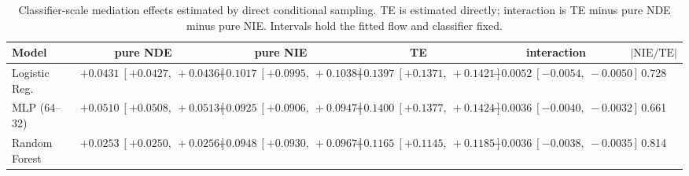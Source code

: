 \begin{table}[htbp]
  \centering
  \caption{Classifier-scale mediation effects estimated by direct conditional sampling. TE is estimated directly; interaction is TE minus pure NDE minus pure NIE. Intervals hold the fitted flow and classifier fixed.}
  \label{tab:german_synth_m05_gap_overall}
  \begin{tabular}{lccccc}
    \toprule
    Model & pure NDE & pure NIE & TE & interaction & $|\mathrm{NIE}/\mathrm{TE}|$ \\
    \midrule
    Logistic Reg. & $+0.0431\ [+0.0427,\ +0.0436]$ & $+0.1017\ [+0.0995,\ +0.1038]$ & $+0.1397\ [+0.1371,\ +0.1421]$ & $-0.0052\ [-0.0054,\ -0.0050]$ & 0.728 \\
    MLP (64--32) & $+0.0510\ [+0.0508,\ +0.0513]$ & $+0.0925\ [+0.0906,\ +0.0947]$ & $+0.1400\ [+0.1377,\ +0.1424]$ & $-0.0036\ [-0.0040,\ -0.0032]$ & 0.661 \\
    Random Forest & $+0.0253\ [+0.0250,\ +0.0256]$ & $+0.0948\ [+0.0930,\ +0.0967]$ & $+0.1165\ [+0.1145,\ +0.1185]$ & $-0.0036\ [-0.0038,\ -0.0035]$ & 0.814 \\
    \bottomrule
  \end{tabular}
\end{table}
